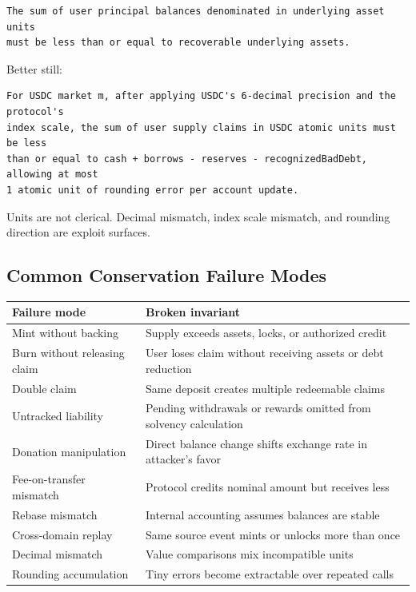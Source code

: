 \begin{lstlisting}
The sum of user principal balances denominated in underlying asset units
must be less than or equal to recoverable underlying assets.
\end{lstlisting}

Better still:

\begin{lstlisting}
For USDC market m, after applying USDC's 6-decimal precision and the protocol's
index scale, the sum of user supply claims in USDC atomic units must be less
than or equal to cash + borrows - reserves - recognizedBadDebt, allowing at most
1 atomic unit of rounding error per account update.
\end{lstlisting}

Units are not clerical. Decimal mismatch, index scale mismatch, and
rounding direction are exploit surfaces.

\subsection{Common Conservation Failure Modes}

{\def\LTcaptype{none} %
\begin{longtable}[]{@{}
  >{\raggedright\arraybackslash}p{}
  >{\raggedright\arraybackslash}p{}@{}}
\toprule\noalign{}
\begin{minipage}[b]{\linewidth}\raggedright
Failure mode
\end{minipage} & \begin{minipage}[b]{\linewidth}\raggedright
Broken invariant
\end{minipage} \\
\midrule\noalign{}
\endhead
\bottomrule\noalign{}
\endlastfoot
Mint without backing & Supply exceeds assets, locks, or authorized
credit \\
Burn without releasing claim & User loses claim without receiving assets
or debt reduction \\
Double claim & Same deposit creates multiple redeemable claims \\
Untracked liability & Pending withdrawals or rewards omitted from
solvency calculation \\
Donation manipulation & Direct balance change shifts exchange rate in
attacker's favor \\
Fee-on-transfer mismatch & Protocol credits nominal amount but receives
less \\
Rebase mismatch & Internal accounting assumes balances are stable \\
Cross-domain replay & Same source event mints or unlocks more than
once \\
Decimal mismatch & Value comparisons mix incompatible units \\
Rounding accumulation & Tiny errors become extractable over repeated
calls \\
\end{longtable}
}

